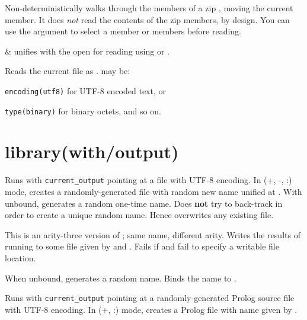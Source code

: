 \begin{description}
Non-deterministically walks through the members of a zip ,
moving the  current member. It does \textit{not} read the contents of
the zip members, by design. You can use the  argument to select
a member or members before reading.

\begin{arguments}
 & unifies with the open  for reading using
 or . \\
\end{arguments}

Reads the current  file as .  may be:

\begin{shortlist}
    \item \verb$encoding(utf8)$ for UTF-8 encoded text, or
    \item \verb$type(binary)$ for binary octets, and so on.
\end{shortlist}
\end{description}

\chapter{library(with/output)}\label{sec:output}

\begin{description}
Runs  with \verb$current_output$ pointing at a file with UTF-8
encoding. In (+, -, :) mode, creates a randomly-generated file with
random new name unified at . With  unbound, generates a
random one-time name. Does \textbf{not} try to back-track in order to
create a unique random name. Hence overwrites any existing file.

This is an arity-three version of ; same name,
different arity. Writes the results of running  to some file
given by  and . Fails if  and  fail to
specify a writable file location.

When  unbound, generates a random name. Binds the name to .

Runs  with \verb$current_output$ pointing at a randomly-generated
Prolog source file with UTF-8 encoding. In (+, :) mode, creates a
Prolog file with name given by .
\end{description}

